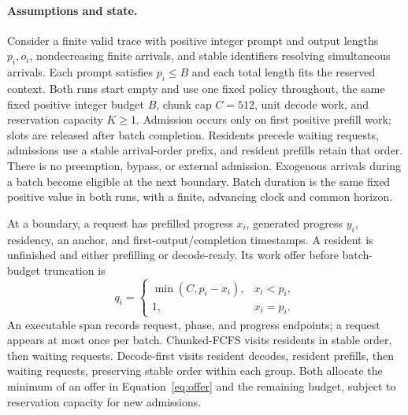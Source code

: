 \paragraph{Assumptions and state.}
Consider a finite valid trace with positive integer prompt and output lengths
$p_i,o_i$, nondecreasing finite arrivals, and stable identifiers resolving
simultaneous arrivals. Each prompt satisfies $p_i\leq B$ and each total
length fits the reserved context. Both runs start empty and use one fixed
policy throughout, the same fixed positive integer budget $B$, chunk cap
$C=512$, unit decode work, and reservation capacity $K\geq1$. Admission
occurs only on first positive prefill work; slots are released after batch
completion. Residents precede waiting requests, admissions use a stable
arrival-order prefix, and resident prefills retain that order. There is no
preemption, bypass, or external admission. Exogenous arrivals during a batch
become eligible at the next boundary. Batch duration is the same fixed
positive value in both runs, with a finite, advancing clock and common horizon.

At a boundary, a request has prefilled progress $x_i$, generated progress
$y_i$, residency, an anchor, and first-output/completion timestamps. A
resident is unfinished and either prefilling or decode-ready. Its work
offer before batch-budget truncation is
\begin{equation}\label{eq:offer}
 q_i=\begin{cases}\min(C,p_i-x_i),&x_i<p_i,\\1,&x_i=p_i.\end{cases}
\end{equation}
An executable span records request, phase, and progress endpoints; a request
appears at most once per batch. Chunked-FCFS visits residents in stable order,
then waiting requests. Decode-first visits resident decodes, resident
prefills, then waiting requests, preserving stable order within each group.
Both allocate the minimum of an offer in Equation~\ref{eq:offer} and the
remaining budget, subject to reservation capacity for new admissions.


